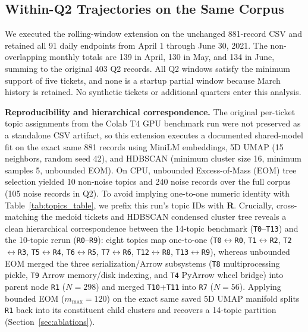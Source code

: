 \subsection{Within-Q2 Trajectories on the Same Corpus}
\label{sec:q2_trajectory_results}
We executed the rolling-window extension on the unchanged 881-record CSV and retained all 91 daily endpoints from April 1 through June 30, 2021. The non-overlapping monthly totals are 139 in April, 130 in May, and 134 in June, summing to the original 403 Q2 records. All Q2 windows satisfy the minimum support of five tickets, and none is a startup partial window because March history is retained. No synthetic tickets or additional quarters enter this analysis.

\textbf{Reproducibility and hierarchical correspondence.} The original per-ticket topic assignments from the Colab T4 GPU benchmark run were not preserved as a standalone CSV artifact, so this extension executes a documented shared-model fit on the exact same 881 records using MiniLM embeddings, 5D UMAP (15 neighbors, random seed 42), and HDBSCAN (minimum cluster size 16, minimum samples 5, unbounded EOM). On CPU, unbounded Excess-of-Mass (EOM) tree selection yielded 10 non-noise topics and 240 noise records over the full corpus (105 noise records in Q2). To avoid implying one-to-one numeric identity with Table~\ref{tab:topics_table}, we prefix this run's topic IDs with \textbf{R}. Crucially, cross-matching the medoid tickets and HDBSCAN condensed cluster tree reveals a clean hierarchical correspondence between the 14-topic benchmark (\texttt{T0}--\texttt{T13}) and the 10-topic rerun (\texttt{R0}--\texttt{R9}): eight topics map one-to-one (\texttt{T0}$\leftrightarrow$\texttt{R0}, \texttt{T1}$\leftrightarrow$\texttt{R2}, \texttt{T2}$\leftrightarrow$\texttt{R3}, \texttt{T5}$\leftrightarrow$\texttt{R4}, \texttt{T6}$\leftrightarrow$\texttt{R5}, \texttt{T7}$\leftrightarrow$\texttt{R6}, \texttt{T12}$\leftrightarrow$\texttt{R8}, \texttt{T13}$\leftrightarrow$\texttt{R9}), whereas unbounded EOM merged the three serialization/Arrow subsystems (\texttt{T8} multiprocessing pickle, \texttt{T9} Arrow memory/disk indexing, and \texttt{T4} PyArrow wheel bridge) into parent node \texttt{R1} ($N=298$) and merged \texttt{T10}+\texttt{T11} into \texttt{R7} ($N=56$). Applying bounded EOM ($m_{\max}=120$) on the exact same saved 5D UMAP manifold splits \texttt{R1} back into its constituent child clusters and recovers a 14-topic partition (Section~\ref{sec:ablations}).

